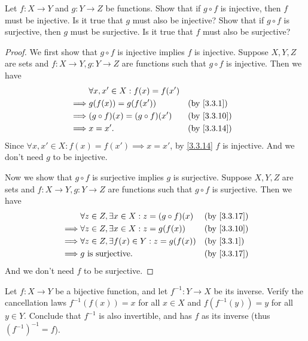 \begin{ex}\label{ex:3.3.5}
  Let \(f : X \to Y\) and \(g : Y \to Z\) be functions.
  Show that if \(g \circ f\) is injective, then \(f\) must be injective.
  Is it true that \(g\) must also be injective?
  Show that if \(g \circ f\) is surjective, then \(g\) must be surjective.
  Is it true that \(f\) must also be surjective?
\end{ex}

\begin{proof}
  We first show that \(g \circ f\) is injective implies \(f\) is injective.
  Suppose \(X, Y, Z\) are sets and \(f : X \to Y, g : Y \to Z\) are functions such that \(g \circ f\) is injective.
  Then we have
  \begin{align*}
             & \forall x, x' \in X : f(x) = f(x')                  \\
    \implies & g(f(x)) = g(f(x'))                 &  & \by{3.3.1}  \\
    \implies & (g \circ f)(x) = (g \circ f)(x')   &  & \by{3.3.10} \\
    \implies & x = x'.                            &  & \by{3.3.14}
  \end{align*}
  Since \(\forall x, x' \in X : f(x) = f(x') \implies x = x'\), by \cref{3.3.14} \(f\) is injective.
  And we don't need \(g\) to be injective.

  Now we show that \(g \circ f\) is surjective implies \(g\) is surjective.
  Suppose \(X, Y, Z\) are sets and \(f : X \to Y, g : Y \to Z\) are functions such that \(g \circ f\) is surjective.
  Then we have
  \begin{align*}
             & \forall z \in Z, \exists x \in X : z = (g \circ f)(x) &  & \by{3.3.17} \\
    \implies & \forall z \in Z, \exists x \in X : z = g(f(x))        &  & \by{3.3.10} \\
    \implies & \forall z \in Z, \exists f(x) \in Y : z = g(f(x))     &  & \by{3.3.1}  \\
    \implies & g \text{ is surjective}.                              &  & \by{3.3.17}
  \end{align*}
  And we don't need \(f\) to be surjective.
\end{proof}

\begin{ex}\label{ex:3.3.6}
  Let \(f : X \to Y\) be a bijective function, and let \(f^{-1} : Y \to X\) be its inverse.
  Verify the cancellation laws \(f^{-1}(f(x)) = x\) for all \(x \in X\) and \(f(f^{-1}(y)) = y\) for all \(y \in Y\).
  Conclude that \(f^{-1}\) is also invertible, and has \(f\) as its inverse (thus \((f^{-1})^{-1} = f\)).
\end{ex}

